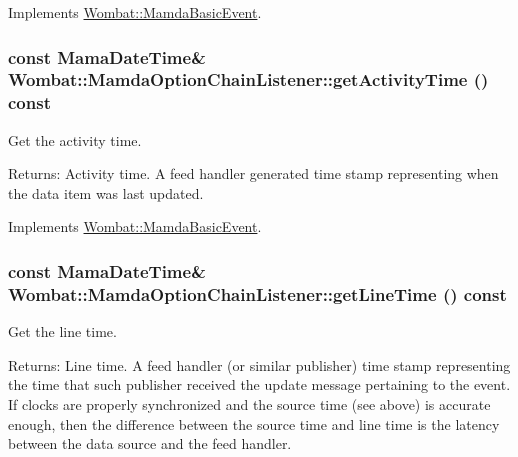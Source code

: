 Implements \hyperlink{classWombat_1_1MamdaBasicEvent_60b5d51f3799c4762090505ef5b213e9}{Wombat::Mamda\-Basic\-Event}.\hypertarget{classWombat_1_1MamdaOptionChainListener_4a54b34d8e87413ea30e83b8e75d9d78}{
\subsubsection[getActivityTime]{\setlength{\rightskip}{0pt plus 5cm}const Mama\-Date\-Time\& Wombat::Mamda\-Option\-Chain\-Listener::get\-Activity\-Time () const}}
\label{classWombat_1_1MamdaOptionChainListener_4a54b34d8e87413ea30e83b8e75d9d78}


Get the activity time. 

\begin{Desc}
\item[Returns:]Activity time. A feed handler generated time stamp representing when the data item was last updated. \end{Desc}


Implements \hyperlink{classWombat_1_1MamdaBasicEvent_b3810afc69474ef3b192ee4c9307e714}{Wombat::Mamda\-Basic\-Event}.\hypertarget{classWombat_1_1MamdaOptionChainListener_4d3d107d4aea29b42a262071c0a4d0ed}{
\subsubsection[getLineTime]{\setlength{\rightskip}{0pt plus 5cm}const Mama\-Date\-Time\& Wombat::Mamda\-Option\-Chain\-Listener::get\-Line\-Time () const}}
\label{classWombat_1_1MamdaOptionChainListener_4d3d107d4aea29b42a262071c0a4d0ed}


Get the line time. 

\begin{Desc}
\item[Returns:]Line time. A feed handler (or similar publisher) time stamp representing the time that such publisher received the update message pertaining to the event. If clocks are properly synchronized and the source time (see above) is accurate enough, then the difference between the source time and line time is the latency between the data source and the feed handler. \end{Desc}


